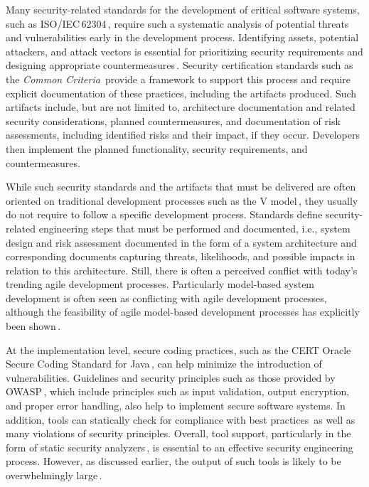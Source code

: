 Many security-related standards for the development of critical software systems, such as ISO/IEC\,62304\,\cite{IEC62304}, require such a systematic analysis of potential threats and vulnerabilities early in the development process.
Identifying assets, potential attackers, and attack vectors is essential for prioritizing security requirements and designing appropriate countermeasures\,\cite{TUMA2018275}.
Security certification standards such as the \emph{Common Criteria}\,\cite{cc} provide a framework to support this process and require explicit documentation of these practices, including the artifacts produced. Such artifacts include, but are not limited to, architecture documentation and related security considerations, planned countermeasures, and documentation of risk assessments, including identified risks and their impact, if they occur.
Developers then implement the planned functionality, security requirements, and countermeasures.

While such security standards and the artifacts that must be delivered are often oriented on traditional development processes such as the V model\,\cite{MuellerEttrich1997}, they usually do not require to follow a specific development process.
Standards define security-related engineering steps that must be performed and documented, i.e., system design and risk assessment documented in the form of a system architecture and corresponding documents capturing threats, likelihoods, and possible impacts in relation to this architecture.
Still, there is often a perceived conflict with today's trending agile development processes.
Particularly model-based system development is often seen as conflicting with agile development processes, although the feasibility of agile model-based development processes has explicitly been shown\,\cite{Gray2018}.

At the implementation level, secure coding practices, such as the CERT Oracle Secure Coding Standard for Java\,\cite{long2011cert}, can help minimize the introduction of vulnerabilities.
Guidelines and security principles such as those provided by OWASP\,\cite{secure-coding}, which include principles such as input validation, output encryption, and proper error handling, also help to implement secure software systems.
In addition, tools can statically check for compliance with best practices\,\cite{sonar} as well as many violations of security principles.
Overall, tool support, particularly in the form of static security analyzers\,\cite{BCP+13}, is essential to an effective security engineering process.
However, as discussed earlier, the output of such tools is likely to be overwhelmingly large\,\cite{Walden2014}.

